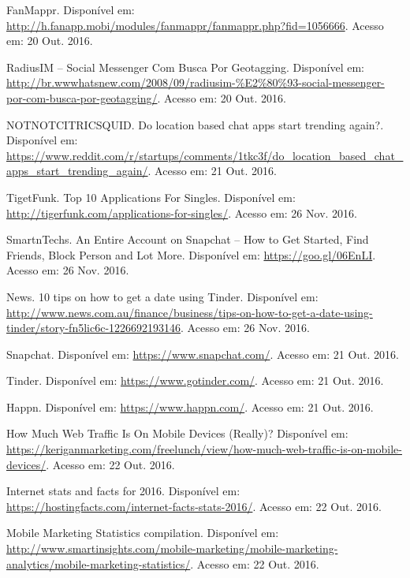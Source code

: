 \documentclass[brazil,ruledheader]{abntifes}
\begin{document}
\begin{thebibliography}{9}
		FanMappr. Disponível em: \url{http://h.fanapp.mobi/modules/fanmappr/fanmappr.php?fid=1056666}.
		Acesso em: 20 Out. 2016.
		
		RadiusIM – Social Messenger Com Busca Por Geotagging. Disponível em: \url{http://br.wwwhatsnew.com/2008/09/radiusim-%E2%80%93-social-messenger-por-com-busca-por-geotagging/}.
			Acesso em: 20 Out. 2016.
			
		NOTNOTCITRICSQUID. Do location based chat apps start trending again?. Disponível em: \url{https://www.reddit.com/r/startups/comments/1tkc3f/do_location_based_chat_apps_start_trending_again/}.
		Acesso em: 21 Out. 2016.
		
		TigetFunk. Top 10 Applications For Singles. Disponível em: \url{http://tigerfunk.com/applications-for-singles/}.
		Acesso em: 26 Nov. 2016.
		
		SmartnTechs. An Entire Account on Snapchat – How to Get Started, Find Friends, Block Person and Lot More. Disponível em: 
		\url{https://goo.gl/06EnLI}.
		Acesso em: 26 Nov. 2016.
		
		News. 10 tips on how to get a date using Tinder. Disponível em: \url{http://www.news.com.au/finance/business/tips-on-how-to-get-a-date-using-tinder/story-fn5lic6c-1226692193146}.
		Acesso em: 26 Nov. 2016.
		
		Snapchat. Disponível em: \url{https://www.snapchat.com/}.
		Acesso em: 21 Out. 2016.
		
		Tinder. Disponível em: \url{https://www.gotinder.com/}.
		Acesso em: 21 Out. 2016.
		
		Happn. Disponível em: \url{https://www.happn.com/}.
		Acesso em: 21 Out. 2016.
		
		How Much Web Traffic Is On Mobile Devices (Really)? Disponível em: \url{https://keriganmarketing.com/freelunch/view/how-much-web-traffic-is-on-mobile-devices/}.
		Acesso em: 22 Out. 2016.
		
		Internet stats and facts for 2016. Disponível em: \url{https://hostingfacts.com/internet-facts-stats-2016/}.
		Acesso em: 22 Out. 2016.
		
		Mobile Marketing Statistics compilation. Disponível em: \url{http://www.smartinsights.com/mobile-marketing/mobile-marketing-analytics/mobile-marketing-statistics/}.
		Acesso em: 22 Out. 2016.
		

\end{thebibliography}
\end{document}
